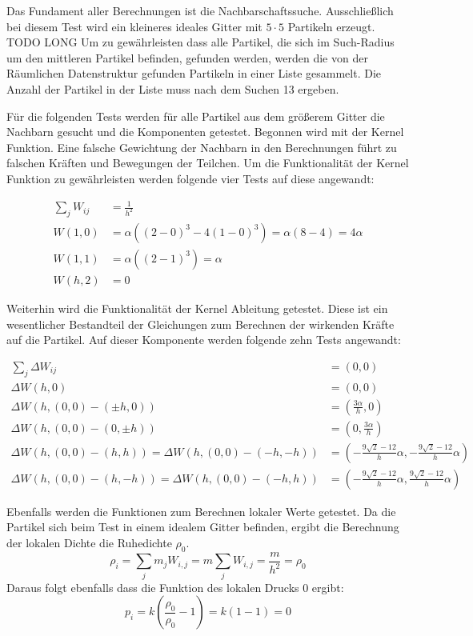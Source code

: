 \documentclass[a4paper, 12pt]{article}
\begin{document}
Das Fundament aller Berechnungen ist die Nachbarschaftssuche. Ausschließlich bei diesem Test wird ein kleineres ideales Gitter mit $5 \cdot 5$ Partikeln erzeugt. TODO LONG Um zu gewährleisten dass alle Partikel, die sich im Such-Radius um den mittleren Partikel befinden, gefunden werden, werden die von der Räumlichen Datenstruktur gefunden Partikeln in einer Liste gesammelt. Die Anzahl der Partikel in der Liste muss nach dem Suchen 13 ergeben.

Für die folgenden Tests werden für alle Partikel aus dem größerem Gitter die Nachbarn gesucht und die Komponenten getestet. 
Begonnen wird mit der Kernel Funktion. Eine falsche Gewichtung der Nachbarn in den Berechnungen führt zu falschen Kräften und Bewegungen der Teilchen. Um die Funktionalität der Kernel Funktion zu gewährleisten werden folgende vier Tests \cite{huang2024journey} auf diese angewandt:

\begin{align*}
	\sum_{j} W_{ij} &= \frac{1}{h^2}\\
	W(1, 0) &= \alpha ((2-0)^3 - 4(1-0)^3) = \alpha (8 - 4) = 4\alpha\\
	W(1, 1) &= \alpha ((2-1)^3) = \alpha\\
	W(h, 2) &= 0
\end{align*}

Weiterhin wird die Funktionalität der Kernel Ableitung getestet. Diese ist ein wesentlicher Bestandteil der Gleichungen zum Berechnen der wirkenden Kräfte auf die Partikel. Auf dieser Komponente werden folgende zehn Tests \cite{huang2024journey} angewandt:

\begin{align*}
	\sum_{j} \Delta W_{ij} &= (0, 0)\\
	\Delta W(h, 0) &= (0, 0)\\
	\Delta W(h, (0, 0) - (\pm h, 0)) &= (\frac{3\alpha}{h}, 0)\\
	\Delta W(h, (0, 0) - (0, \pm h)) &= (0, \frac{3\alpha}{h})\\
	\Delta W(h, (0, 0) - (h, h)) = \Delta W(h, (0, 0) - (- h, - h))&= (-\frac{9\sqrt{2} - 12}{h} \alpha,-\frac{9\sqrt{2} - 12}{h} \alpha)\\
	\Delta W(h, (0, 0) - (h, -h)) = \Delta W(h, (0, 0) - (-h, h)) &= (-\frac{9\sqrt{2} - 12}{h} \alpha,\frac{9\sqrt{2} - 12}{h} \alpha)
\end{align*}

Ebenfalls werden die Funktionen zum Berechnen lokaler Werte getestet. Da die Partikel sich beim Test in einem idealem Gitter befinden, ergibt die Berechnung der lokalen Dichte die Ruhedichte $\rho_0$.
\[\rho_i = \sum_{j} m_j W_{i, j} = m \sum_{j} W_{i, j} = \frac{m}{h^2} = \rho_0\]
Daraus folgt ebenfalls dass die Funktion des lokalen Drucks 0 ergibt:
\[p_i = k(\frac{\rho_0}{\rho_0} - 1) = k(1 - 1) = 0\]
\end{document}
